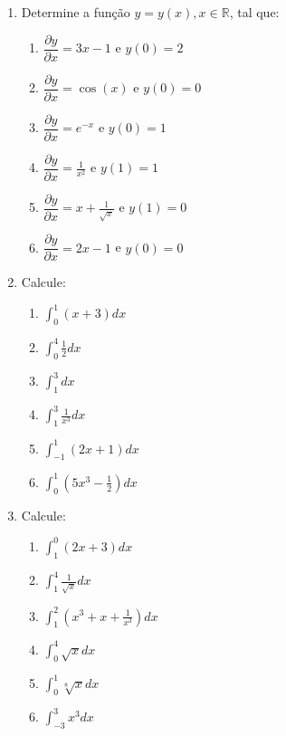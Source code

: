 \documentclass[oneside,a4paper,12pt]{article}
\begin{document}
\begin{enumerate}
	
	\item Determine a função $y=y(x), x \in \mathbb{R}$, tal que:
	\begin{multicols}{2}
		\begin{enumerate}
			\item $\dfrac{\partial y}{\partial x}= 3x - 1$ e $y(0) = 2$
			\item $\dfrac{\partial y}{\partial x}= \cos(x)$ e $y(0) = 0$
			\item $\dfrac{\partial y}{\partial x}= e^{-x}$ e $y(0) = 1$
			\item $\dfrac{\partial y}{\partial x}= \frac{1}{x^2}$ e $y(1) = 1$
			\item $\dfrac{\partial y}{\partial x}= x + \frac{1}{\sqrt{x}}$ e $y(1) = 0$
			\item $\dfrac{\partial y}{\partial x}= 2x - 1$ e $y(0) = 0$
		\end{enumerate}
	\end{multicols}
	\item Calcule:
	\begin{multicols}{2}
		\begin{enumerate}
			\item $\displaystyle \int_{0}^{1}(x+3)dx$
			\item $\displaystyle \int_{0}^{4}\frac{1}{2}dx$
			\item $\displaystyle \int_{1}^{3}dx$
			\item $\displaystyle \int_{1}^{3}\frac{1}{x^3}dx$
			\item $\displaystyle \int_{-1}^{1}(2x + 1)dx$
			\item $\displaystyle \int_{0}^{1}(5x^3 - \frac{1}{2})dx$
		\end{enumerate}
	\end{multicols}	

	\item Calcule:
	\begin{multicols}{2}
		\begin{enumerate}
			\item $\displaystyle \int_{1}^{0}(2x + 3)dx$
			\item $\displaystyle \int_{1}^{4}\frac{1}{\sqrt{x}}dx$
			\item $\displaystyle \int_{1}^{2}(x^3 + x + \frac{1}{x^3})dx$
			\item $\displaystyle \int_{0}^{4}\sqrt{x}dx$
			\item $\displaystyle \int_{0}^{1}\sqrt[8]{x}dx$
			\item $\displaystyle \int_{-3}^{3}x^3 dx$
		\end{enumerate}
	\end{multicols}


\end{enumerate}
\end{document}
